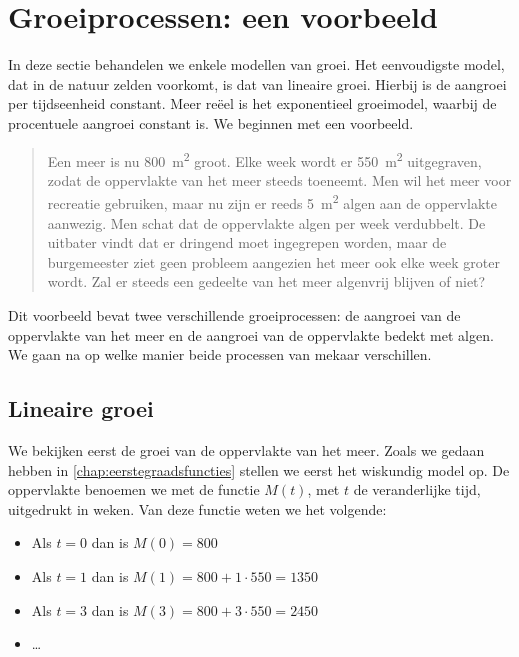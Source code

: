 \newpage
\section{Groeiprocessen: een voorbeeld}
In deze sectie behandelen we enkele modellen van groei. Het eenvoudigste model, dat in de natuur zelden voorkomt, is dat van lineaire groei. Hierbij is de aangroei per tijdseenheid constant. Meer re\"eel is het exponentieel groeimodel, waarbij de procentuele aangroei constant is. We beginnen met een voorbeeld.

\label{page:meeralgen}
\begin{quote}
    Een meer is nu \SI{800}{\square\meter} groot. Elke week wordt er \SI{550}{\square\meter} uitgegraven, zodat de oppervlakte van het meer steeds
toeneemt. Men wil het meer voor recreatie gebruiken, maar nu zijn
er reeds \SI{5}{\square\meter} algen aan de oppervlakte aanwezig. Men schat
dat de oppervlakte algen per week verdubbelt. De uitbater vindt
dat er dringend moet ingegrepen worden, maar de burgemeester ziet
geen probleem aangezien het meer ook elke week groter wordt.
Zal er steeds een gedeelte van het meer algenvrij blijven of niet?
\end{quote}
Dit voorbeeld bevat twee verschillende groeiprocessen: de aangroei van de
oppervlakte van het meer en de aangroei van de oppervlakte bedekt met algen.
We gaan na op welke manier beide processen van mekaar verschillen.

\subsection{Lineaire groei}
We bekijken eerst de groei van de oppervlakte van het meer. Zoals we gedaan hebben in \cref{chap:eerstegraadsfuncties} stellen we eerst het wiskundig model op. 
De oppervlakte benoemen we met de functie $M(t)$, met $t$ de veranderlijke tijd, uitgedrukt in weken.
Van deze functie weten we het volgende:

\begin{itemize}
  \item  Als $t=0$ dan is $M(0)=800$
  \item  Als $t=1$ dan is $M(1)=800+1\cdot 550=1350$
  \item  Als $t=3$ dan is $M(3)=800+3\cdot 550=2450$
  \item  \ldots
\end{itemize}

